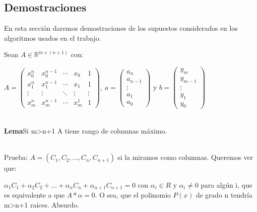 \subsection{Demostraciones}

En esta sección daremos demostraciones de los supuestos considerados en los algoritmos usados en el
trabajo.

Sean $A \in \mathbb{R}^{m\times (n+1)}$ con:


  $ A = \begin{pmatrix}
    x_0^n & x_0^{n-1} & \cdots &  x_0  & 1 \\
    x_1^{n} & x_1^{n-1} & \cdots & x_1 & 1 \\
    \vdots  & \vdots  & \ddots & \vdots  & \vdots \\
    x_m^{n} & x_m^{n-1} & \cdots & x_m^1 & 1
        \end{pmatrix}, \
   a = \begin{pmatrix}
        a_n \\
        a_{n-1} \\
        \vdots \\
        a_1 \\
        a_0
       \end{pmatrix}
  $ y $
  b = \begin{pmatrix}
        y_m \\
        y_{m-1} \\
        \vdots \\
        y_1 \\
        y_0
       \end{pmatrix}
  $



\ \\
\textbf{Lema}Si m>n+1 A tiene rango de columnas máximo.

\ \\
Prueba:
  $A = ( C_1, C_2, \ldots, C_n, C_{n+1} )$ si la miramos como columnas. Queremos ver que:

$\alpha_1C_1+\alpha_2C_2+\hdots+\alpha_nC_n+\alpha_{n+1}C_{n+1} = 0$ con $\alpha_i \in R$ y $\alpha_i
\neq 0$ para algún i, que es equivalente a que $A * \alpha =0$. O sea, que
el polinomio $P(x)$ de grado n tendría m>n+1 raíces. Absurdo.

